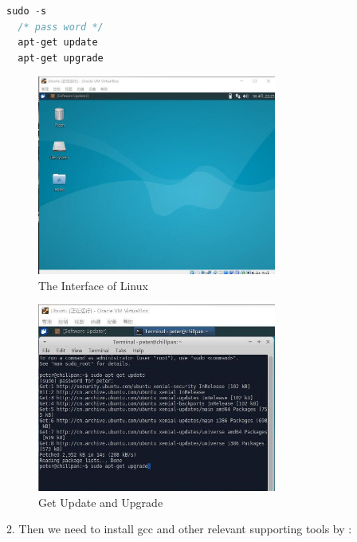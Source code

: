 \documentclass[12pt,a4paper]{article}
\begin{document}
\begin{lstlisting}[language = C]
  sudo -s
  /* pass word */
  apt-get update
  apt-get upgrade 
\end{lstlisting}

\begin{minipage}{0.5\textwidth}
	\begin{figure}[H]
		\centering
		\includegraphics[width= 0.7\textwidth]{./fig/1_interface.jpg}
		\caption{The Interface of Linux}
		\label{fig:interface}
	\end{figure}
\end{minipage}
\begin{minipage}{0.5\textwidth}
	\begin{figure}[H]
		\centering
		\includegraphics[width= 0.7\textwidth]{./fig/2_upgrade}
		\caption{Get Update and Upgrade}
		\label{fig:get update}
	\end{figure}
\end{minipage}

\par \quad \quad

2. Then we need to install gcc and other relevant supporting tools by :
\end{document}
